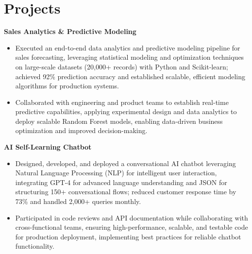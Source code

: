 \documentclass[a4paper,10pt]{article}
\begin{document}
\vspace{-4mm}

\section*{Projects}
\textbf{Sales Analytics \& Predictive Modeling} \\
\begin{itemize}[leftmargin=*, itemsep=0pt, parsep=1pt]
\vspace{-7mm}
    \item Executed an end-to-end data analytics and predictive modeling pipeline for sales forecasting, leveraging statistical modeling and optimization techniques on large-scale datasets (20,000+ records) with Python and Scikit-learn; achieved 92\% prediction accuracy and established scalable, efficient modeling algorithms for production systems.
    \item Collaborated with engineering and product teams to establish real-time predictive capabilities, applying experimental design and data analytics to deploy scalable Random Forest models, enabling data-driven business optimization and improved decision-making.
    \end{itemize}

\vspace{-2mm}
\textbf{AI Self-Learning Chatbot} \\
\begin{itemize}[leftmargin=*, itemsep=0pt, parsep=1pt]
\vspace{-7mm}
    \item Designed, developed, and deployed a conversational AI chatbot leveraging Natural Language Processing (NLP) for intelligent user interaction, integrating GPT-4 for advanced language understanding and JSON for structuring 150+ conversational flows; reduced customer response time by 73\% and handled 2,000+ queries monthly.
    \item Participated in code reviews and API documentation while collaborating with cross-functional teams, ensuring high-performance, scalable, and testable code for production deployment, implementing best practices for reliable chatbot functionality.
\end{itemize}

\vspace{-2mm}
\end{document}
